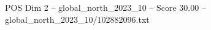 \begin{textsample}{POS Dim 2 – global\_north\_2023\_10 – Score 30.00 – global\_north\_2023\_10/102882096.txt}
\end{textsample}
